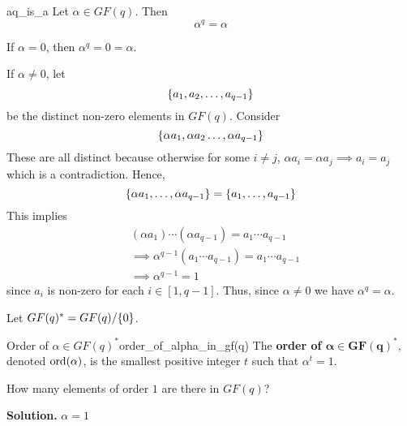 \begin{Theorem}{}{aq_is_a}
    Let $ \alpha\in GF(q) $. Then
    \[ \alpha^q=\alpha \]
\end{Theorem}

\begin{Proof}{}{}
    If $ \alpha=0 $, then $ \alpha^q=0=\alpha $.

    If $ \alpha\neq 0 $, let
    \[ \{a_1,a_2,\ldots ,a_{q-1}\} \]
    be the distinct non-zero elements in $ GF(q) $. Consider
    \[ \{\alpha a_1,\alpha a_2\ldots,\alpha a_{q-1}\} \]
    These are all distinct because otherwise for some $ i\neq j $,
    $ \alpha a_i=\alpha a_j\implies a_i=a_j $ which is a contradiction.
    Hence,
    \[ \{\alpha a_1,\ldots ,\alpha a_{q-1}\}=\{a_1,\ldots ,a_{q-1}\} \]
    This implies
    \begin{align*}
         & (\alpha a_1)\cdots (\alpha a_{q-1})=a_1\cdots a_{q-1}      \\
         & \implies \alpha^{q-1}(a_1\cdots a_{q-1})=a_1\cdots a_{q-1} \\
         & \implies \alpha^{q-1}=1
    \end{align*}
    since $ a_i $ is non-zero for each $ i\in[1,q-1] $.
    Thus, since $ \alpha\neq 0 $ we have $ \alpha^q=\alpha $.
\end{Proof}

\begin{Definition}{}{}
    Let $ GF(q)^*=GF(q)/\{0\} $.
\end{Definition}

\begin{Definition}{Order of $\alpha\in GF(q)^*$}{order_of_alpha_in_gf(q)}
    The \textbf{order of $\symbf{\alpha\in GF(q)^*}$}, denoted
    $ \operatorname{ord}(\alpha) $, is the smallest positive integer $ t $ such that
    $ \alpha^t=1 $.
\end{Definition}

\begin{Example}{}{}
    How many elements of order $ 1 $ are there in $ GF(q) $?

    \textbf{Solution.} $ \alpha=1 $
\end{Example}

